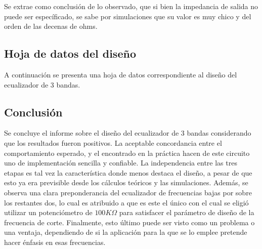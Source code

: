 Se extrae como conclusión de lo observado, que si bien la impedancia de salida no puede ser específicado, se sabe por simulaciones que su valor es muy chico y del orden 
de las decenas de ohms.\\


\subsection{Hoja de datos del diseño}
A continuación se presenta una hoja de datos correspondiente al diseño del ecualizador de 3 bandas.




\subsection{Conclusión}
Se concluye el informe sobre el diseño del ecualizador de 3 bandas considerando que los resultados fueron positivos.
La aceptable concordancia entre el comportamiento esperado, y el encontrado en la práctica hacen de este circuito uno de implementación sencilla y confiable.
La independencia entre las tres etapas es tal vez la característica donde menos destaca el diseño, a pesar de que esto ya era previsible desde los cálculos teóricos y las 
simulaciones.
Además, se observa una clara preponderancia del ecualizador de frecuencias bajas por sobre los restantes dos, lo cual es atribuido a que es este el único con el cual se 
eligió utilizar un potenciómetro de $100K\Omega$ para satisfacer el parámetro de diseño de la frecuencia de corte.
Finalmente, esto último puede ser visto como un problema o una ventaja, dependiendo de si la aplicación para la que se lo emplee pretende hacer énfasis en esas frecuencias.